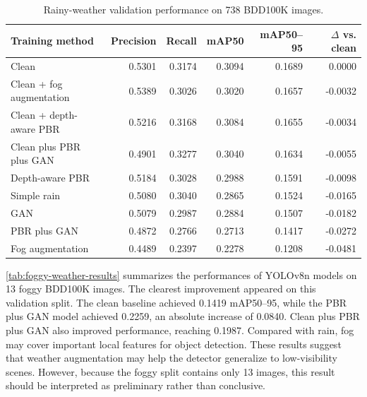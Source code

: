 \documentclass[10pt,letterpaper]{article}
\begin{document}
\begin{table}[!htbp]
\centering
\caption{Rainy-weather validation performance on 738 BDD100K images.}
\label{tab:rainy-weather-results}
\begin{tabular*}{\textwidth}{@{\extracolsep{\fill}}lrrrrr@{}}
\toprule
Training method & Precision & Recall & mAP50 & mAP50--95 & $\Delta$ vs. clean \\
\midrule
Clean & 0.5301 & 0.3174 & 0.3094 & 0.1689 & 0.0000 \\
Clean + fog augmentation & 0.5389 & 0.3026 & 0.3020 & 0.1657 & -0.0032 \\
Clean + depth-aware PBR & 0.5216 & 0.3168 & 0.3084 & 0.1655 & -0.0034 \\
Clean plus PBR plus GAN & 0.4901 & 0.3277 & 0.3040 & 0.1634 & -0.0055 \\
Depth-aware PBR & 0.5184 & 0.3028 & 0.2988 & 0.1591 & -0.0098 \\
Simple rain & 0.5080 & 0.3040 & 0.2865 & 0.1524 & -0.0165 \\
GAN & 0.5079 & 0.2987 & 0.2884 & 0.1507 & -0.0182 \\
PBR plus GAN & 0.4872 & 0.2766 & 0.2713 & 0.1417 & -0.0272 \\
Fog augmentation & 0.4489 & 0.2397 & 0.2278 & 0.1208 & -0.0481 \\
\bottomrule
\end{tabular*}
\end{table}

\autoref{tab:foggy-weather-results} summarizes the performances of YOLOv8n models on 13 foggy BDD100K images. 
The clearest improvement appeared on this validation split. The clean baseline achieved 0.1419 mAP50--95, 
while the PBR plus GAN model achieved 0.2259, an absolute increase of 0.0840. Clean plus PBR plus GAN also improved 
performance, reaching 0.1987. Compared with rain, fog may cover important local features for object detection. 
These results suggest that weather augmentation may help the detector generalize to low-visibility scenes. 
However, because the foggy split contains only 13 images, this result should be interpreted as preliminary rather than conclusive.
\end{document}
